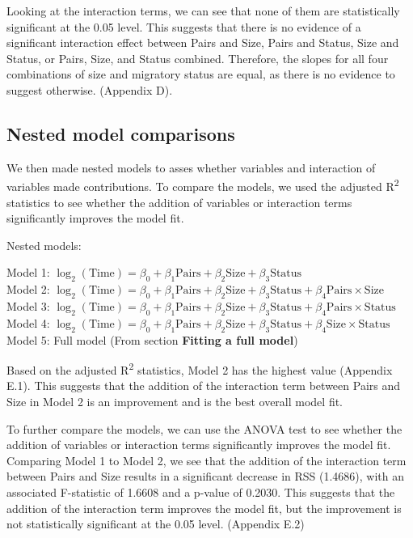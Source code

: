 \documentclass[a4paper, 12pt]{article}
\begin{document}
\begin{spacing}{1.5}
Looking at the interaction terms, we can see that none of them are statistically significant at the 0.05 level. This suggests that there is no evidence of a significant interaction effect between Pairs and Size, Pairs and Status, Size and Status, or Pairs, Size, and Status combined. Therefore, the slopes for all four combinations of size and migratory status are equal, as there is no evidence to suggest otherwise. (Appendix D).

\subsection{Nested model comparisons}
We then made nested models to asses whether variables and interaction of variables made contributions. To compare the models, we used the adjusted R\textsuperscript{2} statistics to see whether the addition of variables or interaction terms significantly improves the model fit.

Nested models:

Model 1: $\log_2(\text{Time}) = \beta_0 + \beta_1\text{Pairs} + \beta_2\text{Size} + \beta_3\text{Status}$\\
Model 2: $\log_2(\text{Time}) = \beta_0 + \beta_1\text{Pairs} + \beta_2\text{Size} + \beta_3\text{Status} + \beta_4\text{Pairs}\times\text{Size}$\\
Model 3: $\log_2(\text{Time}) = \beta_0 + \beta_1\text{Pairs} + \beta_2\text{Size} + \beta_3\text{Status} + \beta_4\text{Pairs}\times\text{Status}$\\
Model 4: $\log_2(\text{Time}) = \beta_0 + \beta_1\text{Pairs} + \beta_2\text{Size} + \beta_3\text{Status} + \beta_4\text{Size}\times\text{Status}$\\
Model 5: Full model (From section \textbf{Fitting a full model})

Based on the adjusted R\textsuperscript{2} statistics, Model 2 has the highest value (Appendix E.1). This suggests that the addition of the interaction term between Pairs and Size in Model 2 is an improvement and is the best overall model fit. 

To further compare the models, we can use the ANOVA test to see whether the addition of variables or interaction terms significantly improves the model fit. Comparing Model 1 to Model 2, we see that the addition of the interaction term between Pairs and Size results in a significant decrease in RSS (1.4686), with an associated F-statistic of 1.6608 and a p-value of 0.2030. This suggests that the addition of the interaction term improves the model fit, but the improvement is not statistically significant at the 0.05 level. (Appendix E.2)


\end{spacing}
\end{document}

